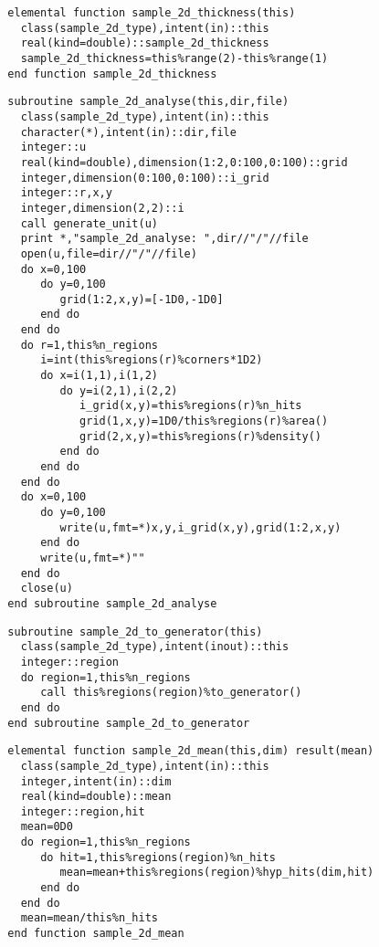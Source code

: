 \begin{Verbatim}
  elemental function sample_2d_thickness(this)
    class(sample_2d_type),intent(in)::this
    real(kind=double)::sample_2d_thickness
    sample_2d_thickness=this%range(2)-this%range(1)
  end function sample_2d_thickness
\end{Verbatim}

\begin{Verbatim}
  subroutine sample_2d_analyse(this,dir,file)
    class(sample_2d_type),intent(in)::this
    character(*),intent(in)::dir,file
    integer::u
    real(kind=double),dimension(1:2,0:100,0:100)::grid
    integer,dimension(0:100,0:100)::i_grid
    integer::r,x,y
    integer,dimension(2,2)::i
    call generate_unit(u)
    print *,"sample_2d_analyse: ",dir//"/"//file
    open(u,file=dir//"/"//file)
    do x=0,100
       do y=0,100
          grid(1:2,x,y)=[-1D0,-1D0]
       end do
    end do
    do r=1,this%n_regions
       i=int(this%regions(r)%corners*1D2)
       do x=i(1,1),i(1,2)
          do y=i(2,1),i(2,2)
             i_grid(x,y)=this%regions(r)%n_hits
             grid(1,x,y)=1D0/this%regions(r)%area()
             grid(2,x,y)=this%regions(r)%density()
          end do
       end do
    end do
    do x=0,100
       do y=0,100
          write(u,fmt=*)x,y,i_grid(x,y),grid(1:2,x,y)
       end do
       write(u,fmt=*)""
    end do
    close(u)
  end subroutine sample_2d_analyse
\end{Verbatim}

\begin{Verbatim}
  subroutine sample_2d_to_generator(this)
    class(sample_2d_type),intent(inout)::this
    integer::region
    do region=1,this%n_regions
       call this%regions(region)%to_generator()
    end do
  end subroutine sample_2d_to_generator
\end{Verbatim}

\begin{Verbatim}
  elemental function sample_2d_mean(this,dim) result(mean)
    class(sample_2d_type),intent(in)::this
    integer,intent(in)::dim
    real(kind=double)::mean
    integer::region,hit
    mean=0D0
    do region=1,this%n_regions
       do hit=1,this%regions(region)%n_hits
          mean=mean+this%regions(region)%hyp_hits(dim,hit)
       end do
    end do
    mean=mean/this%n_hits
  end function sample_2d_mean
\end{Verbatim}

